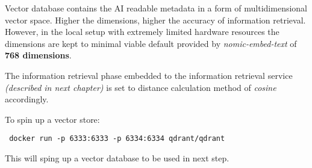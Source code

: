 Vector database contains the AI readable metadata in a form of multidimensional vector space.
Higher the dimensions, higher the accuracy of information retrieval.
However, in the local setup with extremely limited hardware resources the dimensions are kept to minimal
viable default provided by \emph{nomic-embed-text} of \textbf{768 dimensions}.

The information retrieval phase embedded to the information retrieval service \emph{(described in next chapter)} is set to
distance calculation method of \emph{cosine} accordingly.

To spin up a vector store:
\begin{lstlisting}
 docker run -p 6333:6333 -p 6334:6334 qdrant/qdrant
\end{lstlisting}

This will sping up a vector database to be used in next step.
